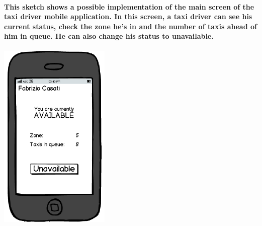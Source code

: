 \begin{center}
\paragraph{This sketch shows a possible implementation of the main screen of the taxi driver mobile application. In this screen, a taxi driver can see his current status, check the zone he’s in and the number of taxis ahead of him in queue. He can also change his status to unavailable.}
\includegraphics[width=150pt,keepaspectratio]{images/taxi_available.png}

\end{center}
